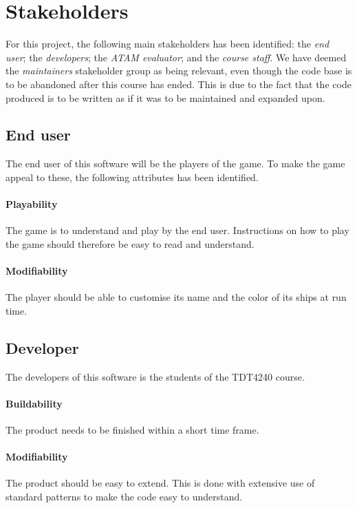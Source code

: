 \chapter{Stakeholders}
\label{cha:stakeholders}
For this project, the following main stakeholders has been identified: the \emph{end user}; the \emph{developers}; the \emph{ATAM evaluator}; and the \emph{course staff}. We have deemed the \emph{maintainers} stakeholder group as being relevant, even though the code base is to be abandoned after this course has ended. This is due to the fact that the code produced is to be written as if it was to be maintained and expanded upon.

    
    \section{End user}
    The end user of this software will be the players of the game. To make the game appeal to these, the following attributes has been identified.

        \subsubsection*{Playability}
        The game is to understand and play by the end user. Instructions on how to play the game should therefore be easy to read and understand.

        \subsubsection*{Modifiability}
        The player should be able to customise its name and the color of its ships at run time.
    
    
    \section{Developer}
    The developers of this software is the students of the TDT4240 course.

        \subsubsection*{Buildability}
        The product needs to be finished within a short time frame.
        
        \subsubsection*{Modifiability}
        The product should be easy to extend. This is done with extensive use of standard patterns to make the code easy to understand.

